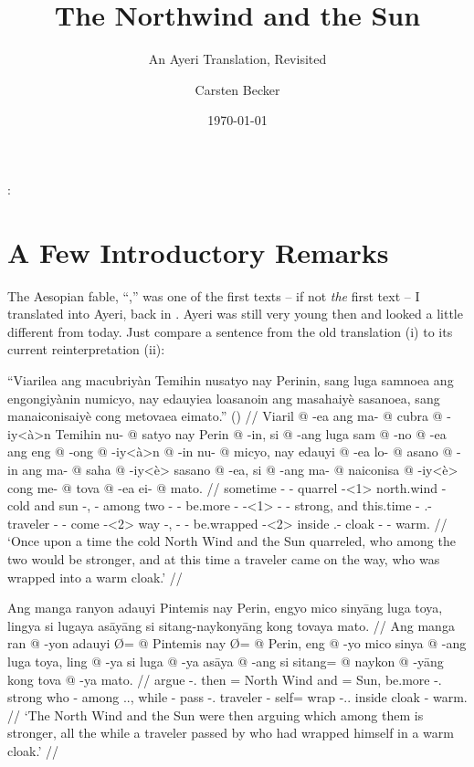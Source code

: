 \documentclass[12pt,paper=a4]{scrartcl}
\author{Carsten Becker}
\title{The Northwind and the Sun}
\subtitle{An Ayeri Translation, Revisited}
\date{\today} %
\newenvironment{mytitle}{
    \hfill
    \begin{minipage}{0.667\textwidth}
	\vspace{\baselineskip}
	\begin{center}
	    \Large
	    \sffamily\bfseries
	    \makeatletter
}{
	    \makeatother
	\end{center}
	\vspace{1em}
    \end{minipage}
    \hfill
}
\begin{document}

\begin{mytitle}
    \@title:\\
    \@subtitle
\end{mytitle}

\section{A Few Introductory Remarks}

The Aesopian fable, \enquote{,} was one of the first texts -- if not \emph{the} first text -- I translated into Ayeri, back in \citeyear{becker2004}. Ayeri was still very young then and looked a little different from today. Just compare a sentence from the old translation (i) to its current reinterpretation (ii):

\ex[exno=i, belowexskip=0em]
\begingl
	\glpreamble \enquote{Viarilea ang macubriyàn Temihin nusatyo nay Perinin, sang luga samnoea ang engongiyànin numicyo, nay edauyiea loasanoin ang masahaiyè sasanoea, sang manaiconisaiyè cong metovaea eimato.} (\cite[1]{becker2004}) //
	\gla Viaril @ -ea ang ma- @ cubra @ -iy<à>n Temihin nu- @ satyo nay Perin @ -in, si @ -ang luga sam @ -no @ -ea ang eng @ -ong @ -iy<à>n @ -in nu- @ micyo, nay edauyi @ -ea lo- @ asano @ -in ang ma- @ saha @ -iy<è> sasano @ -ea, si @ -ang ma- @ naiconisa @ -iy<è> cong me- @ tova @ -ea ei- @ mato. //
	\glb sometime -\Loc{} \AgtT{} \Pst{}- quarrel - north.wind \Aarg{}- cold and sun -\Top{}, \Rel{} -\Aarg{} among two -\Nmlz{} -\Loc{} \AgtT{} be.more -\Irr{} - -\Top{} \Aarg{}- strong, and this.time -\Loc{} \Indf{}.\Aarg{}- traveler -\Top{} \AgtT{} \Pst{}- come - way -\Loc{}, \Rel{} -\Aarg{} \Pst{}- be.wrapped - inside \Indf{}.\Parg{}- cloak -\Loc{} \Obl{}- warm. //
	\glft `Once upon a time the cold North Wind and the Sun quarreled, who among the two would be stronger, and at this time a traveler came on the way, who was wrapped into a warm cloak.' //
\endgl\xe

\ex[exno=ii]
\begingl
	\glpreamble Ang manga ranyon adauyi Pintemis nay Perin, engyo mico sinyāng luga toya, lingya si lugaya asāyāng si sitang-naykonyāng kong tovaya mato. //
	\gla Ang manga ran @ -yon adauyi Ø= @ Pintemis nay Ø= @ Perin, eng @ -yo mico sinya @ -ang luga toya, ling @ -ya si luga @ -ya asāya @ -ang si sitang= @ naykon @ -yāng kong tova @ -ya mato. //
	\glb \AgtT{} \Prog{} argue -\Tpl{}.\N{} then \Top{}= {North Wind} and \Top{}= Sun, be.more -\Tsg{}.\N{} strong who -\Aarg{} among \Tpl{}.\N{}.\Loc{}, while -\Loc{} \Rel{} pass -\Tsg{}.\M{} traveler -\Aarg{} \Rel{} self= wrap -\Tsg{}.\M{}.\Aarg{} inside cloak -\Loc{} warm. //
	\glft `The North Wind and the Sun were then arguing which among them is stronger, all the while a traveler passed by who had wrapped himself in a warm cloak.' //
\endgl
\xe
\end{document}
